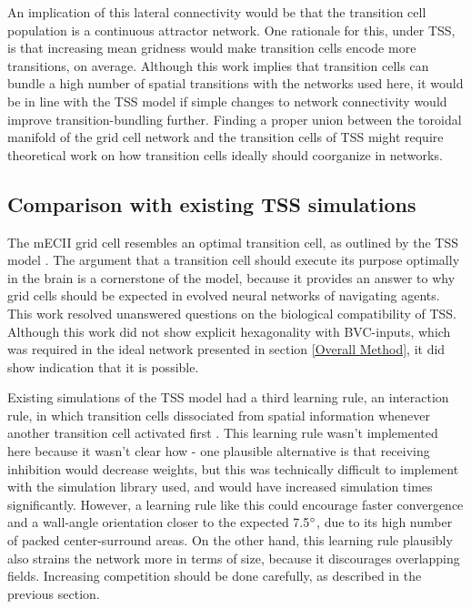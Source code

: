\documentclass{article}
\begin{document}
    An implication of this lateral connectivity would be that the transition cell population is a continuous attractor network. One rationale for this, under TSS, is that increasing mean gridness would make transition cells encode more transitions, on average. Although this work implies that transition cells can bundle a high number of spatial transitions with the networks used here, it would be in line with the TSS model if simple changes to network connectivity would improve transition-bundling further. Finding a proper union between the toroidal manifold of the grid cell network and the transition cells of TSS might require theoretical work on how transition cells ideally should coorganize in networks.
    
    \subsection{Comparison with existing TSS simulations} \label{TSS model comparison}

    The mECII grid cell resembles an optimal transition cell, as outlined by the TSS model \parencite{Waniek2020}. The argument that a transition cell should execute its purpose optimally in the brain is a cornerstone of the model, because it provides an answer to why grid cells should be expected in evolved neural networks of navigating agents. This work resolved unanswered questions on the biological compatibility of TSS. Although this work did not show explicit hexagonality with BVC-inputs, which was required in the ideal network presented in section \ref{Overall Method}, it did show indication that it is possible.

    Existing simulations of the TSS model had a third learning rule, an interaction rule, in which transition cells dissociated from spatial information whenever another transition cell activated first \parencite{Waniek2017}. This learning rule wasn't implemented here because it wasn't clear how - one plausible alternative is that receiving inhibition would decrease weights, but this was technically difficult to implement with the simulation library used, and would have increased simulation times significantly. However, a learning rule like this could encourage faster convergence and a wall-angle orientation closer to the expected 7.5\(\degree\), due to its high number of packed center-surround areas. On the other hand, this learning rule plausibly also strains the network more in terms of size, because it discourages overlapping fields. Increasing competition should be done carefully, as described in the previous section.
\end{document}
